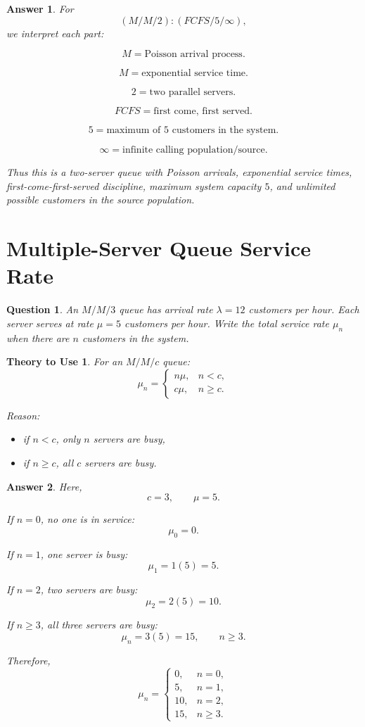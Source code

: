 \documentclass[12pt]{article}
\newtheorem{question}{Question}
\newtheorem*{theory}{Theory to Use}
\newtheorem*{answer}{Answer}
\begin{document}
\begin{answer}
For
\[
(M/M/2):(FCFS/5/\infty),
\]
we interpret each part:

\[
M=\text{Poisson arrival process}.
\]

\[
M=\text{exponential service time}.
\]

\[
2=\text{two parallel servers}.
\]

\[
FCFS=\text{first come, first served}.
\]

\[
5=\text{maximum of 5 customers in the system}.
\]

\[
\infty=\text{infinite calling population/source}.
\]

Thus this is a two-server queue with Poisson arrivals, exponential service times, first-come-first-served discipline, maximum system capacity \(5\), and unlimited possible customers in the source population.
\end{answer}

\section{Multiple-Server Queue Service Rate}

\begin{question}
An \(M/M/3\) queue has arrival rate \(\lambda=12\) customers per hour.
Each server serves at rate \(\mu=5\) customers per hour.
Write the total service rate \(\mu_n\) when there are \(n\) customers in the system.
\end{question}

\begin{theory}
For an \(M/M/c\) queue:
\[
\mu_n=
\begin{cases}
n\mu, & n<c,\\
c\mu, & n\ge c.
\end{cases}
\]

Reason:
\begin{itemize}
    \item if \(n<c\), only \(n\) servers are busy,
    \item if \(n\ge c\), all \(c\) servers are busy.
\end{itemize}
\end{theory}

\begin{answer}
Here,
\[
c=3,\qquad \mu=5.
\]

If \(n=0\), no one is in service:
\[
\mu_0=0.
\]

If \(n=1\), one server is busy:
\[
\mu_1=1(5)=5.
\]

If \(n=2\), two servers are busy:
\[
\mu_2=2(5)=10.
\]

If \(n\ge 3\), all three servers are busy:
\[
\mu_n=3(5)=15,\qquad n\ge 3.
\]

Therefore,
\[
\boxed{
\mu_n=
\begin{cases}
0, & n=0,\\
5, & n=1,\\
10, & n=2,\\
15, & n\ge 3.
\end{cases}
}
\]
\end{answer}
\end{document}

